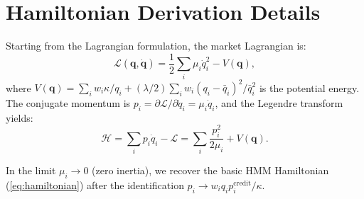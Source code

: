\section{Hamiltonian Derivation Details}

\label{app:derivation}

Starting from the Lagrangian formulation, the market Lagrangian is:
\begin{equation}
\mathcal{L}(\bm{q}, \dot{\bm{q}}) = \frac{1}{2}\sum_i \mu_i \dot{q}_i^2 - V(\bm{q}),
\end{equation}
where $V(\bm{q}) = \sum_i w_i \kappa / q_i + (\lambda/2)\sum_i w_i(q_i - \bar{q}_i)^2/\bar{q}_i^2$ is the potential energy. The conjugate momentum is $p_i = \partial\mathcal{L}/\partial\dot{q}_i = \mu_i\dot{q}_i$, and the Legendre transform yields:
\begin{equation}
\mathcal{H} = \sum_i p_i\dot{q}_i - \mathcal{L} = \sum_i \frac{p_i^2}{2\mu_i} + V(\bm{q}).
\end{equation}

In the limit $\mu_i \to 0$ (zero inertia), we recover the basic HMM Hamiltonian (\ref{eq:hamiltonian}) after the identification $p_i \to w_i q_i p_i^{\text{credit}} / \kappa$.

